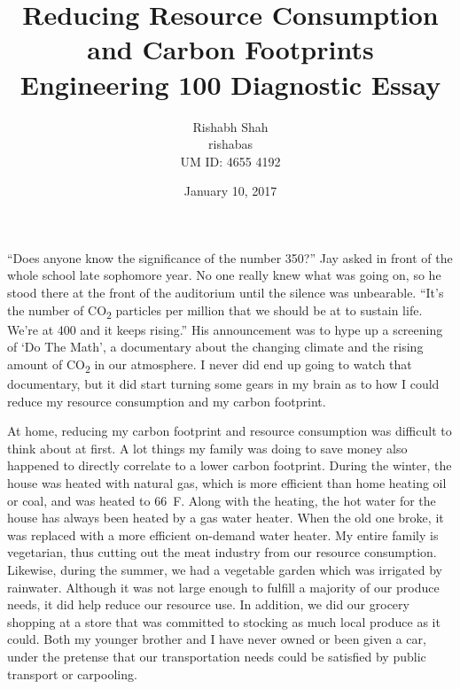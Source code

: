 \documentclass[11pt]{article}
\begin{document}
\title{
	Reducing Resource Consumption and Carbon Footprints\\
	Engineering 100 Diagnostic Essay
	}

\author{
	Rishabh Shah\\
	rishabas\\
	UM ID: 4655 4192}

\date{January 10, 2017}

\maketitle
\thispagestyle{empty}

\newpage
\clearpage
{}


``Does anyone know the significance of the number 350?'' Jay asked in front of the whole school late sophomore year. No one really knew what was going on, so he stood there at the front of the auditorium until the silence was unbearable. ``It's the number of CO\textsubscript{2} particles per million that we should be at to sustain life. We're at 400 and it keeps rising.'' His announcement was to hype up a screening of `Do The Math', a documentary about the changing climate and the rising amount of CO\textsubscript{2} in our atmosphere. I never did end up going to watch that documentary, but it did start turning some gears in my brain as to how I could reduce my resource consumption and my carbon footprint.

At home, reducing my carbon footprint and resource consumption was difficult to think about at first. A lot things my family was doing to save money also happened to directly correlate to a lower carbon footprint. During the winter, the house was heated with natural gas, which is more efficient than home heating oil or coal, and was heated to 66\degree \ F. Along with the heating, the hot water for the house has always been heated by a gas water heater. When the old one broke, it was replaced with a more efficient on-demand water heater. My entire family is vegetarian, thus cutting out the meat industry from our resource consumption. Likewise, during the summer, we had a vegetable garden which was irrigated by rainwater. Although it was not large enough to fulfill a majority of our produce needs, it did help reduce our resource use. In addition, we did our grocery shopping at a store that was committed to stocking as much local produce as it could. Both my younger brother and I have never owned or been given a car, under the pretense that our transportation needs could be satisfied by public transport or carpooling.
\end{document}
